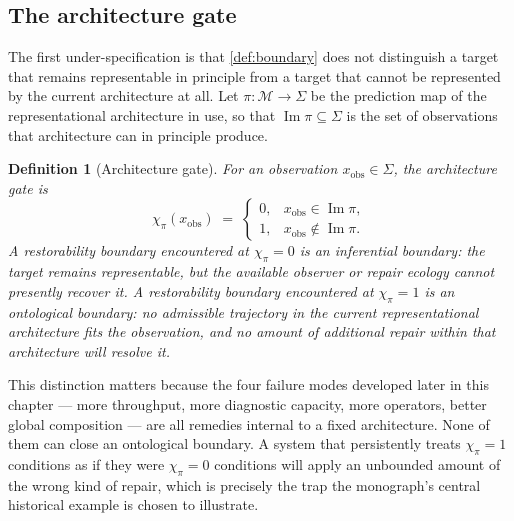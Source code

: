 \documentclass[12pt]{report}
\newtheorem{definition}{Definition}[section]
\begin{document}
\subsection{The architecture gate}

The first under-specification is that \cref{def:boundary} does not
distinguish a target that remains representable in principle from a
target that cannot be represented by the current architecture at all.
Let $\pi : \mathcal{M} \to \Sigma$ be the prediction map of the
representational architecture in use, so that $\operatorname{Im}\pi
\subseteq \Sigma$ is the set of observations that architecture can in
principle produce.

\begin{definition}[Architecture gate]
\label{def:gate}
For an observation $x_{\mathrm{obs}} \in \Sigma$, the architecture gate is
\[
\chi_\pi(x_{\mathrm{obs}}) \;=\;
\begin{cases}
0, & x_{\mathrm{obs}} \in \operatorname{Im}\pi, \\
1, & x_{\mathrm{obs}} \notin \operatorname{Im}\pi.
\end{cases}
\]
A restorability boundary encountered at $\chi_\pi = 0$ is an
\emph{inferential boundary}: the target remains representable, but the
available observer or repair ecology cannot presently recover it. A
restorability boundary encountered at $\chi_\pi = 1$ is an
\emph{ontological boundary}: no admissible trajectory in the current
representational architecture fits the observation, and no amount of
additional repair within that architecture will resolve it.
\end{definition}

This distinction matters because the four failure modes developed later
in this chapter --- more throughput, more diagnostic capacity, more
operators, better global composition --- are all remedies internal to a
fixed architecture. None of them can close an ontological boundary. A
system that persistently treats $\chi_\pi = 1$ conditions as if they were
$\chi_\pi = 0$ conditions will apply an unbounded amount of the wrong kind
of repair, which is precisely the trap the monograph's central historical
example is chosen to illustrate.
\end{document}
